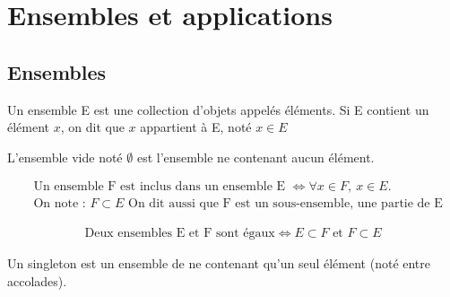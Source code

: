 \chapter{Ensembles et applications}
\section{Ensembles}

\begin{graybox}
	\begin{definition}
		Un ensemble E est une collection d'objets appelés éléments.
		Si E contient un élément $x$, on dit que $x$ appartient à E, noté $x \in E$ 
	\end{definition}
\end{graybox}

\begin{graybox}
	\begin{definition}
		L'ensemble vide noté $\emptyset$ est l'ensemble ne contenant aucun élément.
	\end{definition}
\end{graybox}

\begin{graybox}
	\begin{definition}[Inclusion]
		\begin{align*}
			&\text{Un ensemble F est inclus dans un ensemble E } \iff \forall x \in F,\ x \in E. \\
			&\text{On note : } F \subset E \text{ On dit aussi que F est un sous-ensemble, une partie de E}
		\end{align*}
	\end{definition}
\end{graybox}

\begin{graybox}
	\begin{definition}
		\begin{align*}
			\text{Deux ensembles E et F sont égaux} \iff E \subset F \text{ et } F \subset E
		\end{align*} 
	\end{definition}
\end{graybox}

\begin{graybox}
	\begin{definition}[Singleton]
		Un singleton est un ensemble de ne contenant qu'un seul élément (noté entre accolades).
	\end{definition}
\end{graybox}

